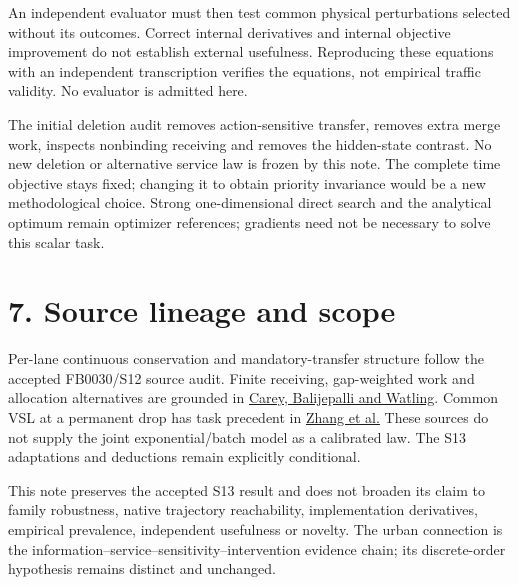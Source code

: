 \documentclass[11pt]{article}
\begin{document}
An independent evaluator must then test common physical perturbations selected
without its outcomes. Correct internal derivatives and internal objective
improvement do not establish external usefulness. Reproducing these equations
with an independent transcription verifies the equations, not empirical traffic
validity. No evaluator is admitted here.

The initial deletion audit removes action-sensitive transfer, removes extra
merge work, inspects nonbinding receiving and removes the hidden-state contrast.
No new deletion or alternative service law is frozen by this note. The complete
time objective stays fixed; changing it to obtain priority invariance would be
a new methodological choice. Strong one-dimensional direct search and the
analytical optimum remain optimizer references; gradients need not be necessary
to solve this scalar task.

\section*{7. Source lineage and scope}
Per-lane continuous conservation and mandatory-transfer structure follow the
accepted FB0030/S12 source audit. Finite receiving, gap-weighted work and
allocation alternatives are grounded in
\href{https://doi.org/10.1007/s11067-013-9193-7}{Carey, Balijepalli and Watling}.
Common VSL at a permanent drop has task precedent in
\href{https://doi.org/10.1080/23249935.2022.2033878}{Zhang et al.}
These sources do not supply the joint exponential/batch model as a calibrated
law. The S13 adaptations and deductions remain explicitly conditional.

This note preserves the accepted S13 result and does not broaden its claim to
family robustness, native trajectory reachability, implementation derivatives,
empirical prevalence, independent usefulness or novelty. The urban connection
is the information--service--sensitivity--intervention evidence chain; its
discrete-order hypothesis remains distinct and unchanged.
\end{document}
